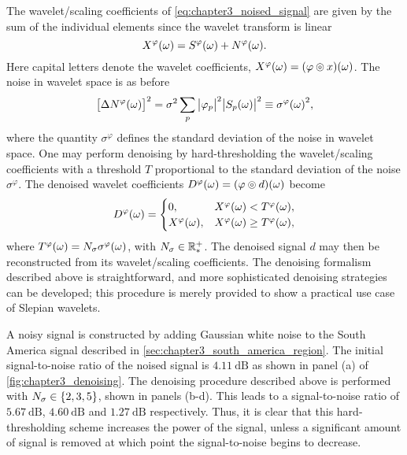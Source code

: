The wavelet/scaling coefficients of \cref{eq:chapter3_noised_signal} are given by the sum of the individual elements since the wavelet transform is linear
%
\begin{equation}
	X^{\varphi}(\omega)
	= S^{\varphi}(\omega) + N^{\varphi}(\omega).
\end{equation}
%
Here capital letters denote the wavelet coefficients, \ie{} \(X^{\varphi}(\omega) = (\varphi \circledcirc{} x)(\omega)\).
%
The noise in wavelet space is as before
%
\begin{equation}
	{\big[\Delta N^{\varphi}(\omega)\big]}^{2}
	= \sigma^{2} \sum\limits_{p} \big\lvert{\varphi}_{p}\big\rvert^{2} \big\lvert{S}_{p}(\omega)\big\rvert^{2}
	\equiv {\sigma^{\varphi}(\omega)}^{2},
\end{equation}
%
where the quantity \(\sigma^{\varphi}\) defines the standard deviation of the noise in wavelet space.
One may perform denoising by hard-thresholding the wavelet/scaling coefficients with a threshold \(T\) proportional to the standard deviation of the noise \(\sigma^{\varphi}\).
The denoised wavelet coefficients \(D^{\varphi}(\omega) = (\varphi \circledcirc{} d)(\omega)\) become
%
\begin{equation}
	D^{\varphi}(\omega) =
	\begin{cases}
		0,
		 & X^{\varphi}(\omega) < T^{\varphi}(\omega),    \\
		X^{\varphi}(\omega),
		 & X^{\varphi}(\omega) \geq T^{\varphi}(\omega),
	\end{cases}
\end{equation}
%
where \(T^{\varphi}(\omega) = N_{\sigma}\sigma^{\varphi}(\omega)\), with \(N_{\sigma} \in \mathbb{R}_{\ast}^{+}{}\).
The denoised signal \(d\) may then be reconstructed from its wavelet/scaling coefficients.
The denoising formalism described above is straightforward, and more sophisticated denoising strategies can be developed; this procedure is merely provided to show a practical use case of Slepian wavelets.

A noisy signal is constructed by adding Gaussian white noise to the South America signal described in \cref{sec:chapter3_south_america_region}.
The initial signal-to-noise ratio of the noised signal is \(\SI{4.11}{\dB}\) as shown in panel (a) of \cref{fig:chapter3_denoising}.
The denoising procedure described above is performed with \(N_{\sigma} \in \{2, 3, 5\}\), shown in panels (b-d).
This leads to a signal-to-noise ratio of \(\SI{5.67}{\dB}\), \(\SI{4.60}{\dB}\) and \(\SI{1.27}{\dB}\) respectively.
Thus, it is clear that this hard-thresholding scheme increases the power of the signal, unless a significant amount of signal is removed at which point the signal-to-noise begins to decrease.


